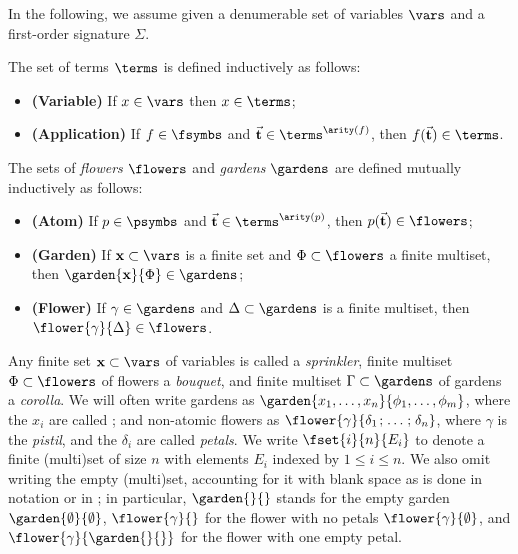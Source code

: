 \begin{scope}
In the following, we assume given a denumerable set of variables $\vars$
and a first-order signature $\Sigma$.

\begin{definition}[Terms]
  The set of terms $\terms$ is defined inductively as follows:
  \begin{itemize}
    \item{\textbf{(Variable)}} If $x \in \vars$ then $x \in \terms$;
    \item{\textbf{(Application)}} If $f \in \fsymbs$ and $\tvec{t}
    \in \terms^{\arity(f)}$, then $f(\tvec{t}) \in \terms$.
  \end{itemize}
\end{definition}

\begin{definition}[Flowers]
  The sets of \emph{flowers} $\flowers$ and \emph{gardens} $\gardens$ are
  defined mutually inductively as follows:
  \begin{itemize}
    \item{\textbf{(Atom)}} If $p \in \psymbs$ and $\tvec{t} \in
    \terms^{\arity(p)}$, then $p(\tvec{t}) \in \flowers$;
    \item{\textbf{(Garden)}} If $\bx \subset \vars$ is a finite set and $\Phi
    \subset \flowers$ a finite multiset, then $\garden{\bx}{\Phi} \in
    \gardens$;
    \item{\textbf{(Flower)}} If $\gamma \in \gardens$ and $\Delta \subset \gardens$
    is a finite multiset, then $\flower{\gamma}{\Delta} \in \flowers$.
  \end{itemize}
\end{definition}

Any finite set $\bx \subset \vars$ of variables is called a \emph{sprinkler},
finite multiset $\Phi \subset \flowers$ of flowers a \emph{bouquet}, and finite
multiset $\Gamma \subset \gardens$ of gardens a \emph{corolla}. We will often
write gardens as $\garden{x_1, \ldots, x_n}{\phi_1, \ldots, \phi_m}$, where the
$x_i$ are called ; and non-atomic flowers as
$\flower{\gamma}{\delta_1 \sep \ldots \sep \delta_n}$, where $\gamma$ is the
\emph{pistil}, and the $\delta_i$ are called \emph{petals}. We write
$\fset{i}{n}{E_i}$ to denote a finite (multi)set of size $n$ with elements $E_i$
indexed by $1 \leq i \leq n$. We also omit writing the empty (multi)set,
accounting for it with blank space as is done in  notation or in ; in
particular, $\garden{{}}{{}}$ stands for the empty garden
$\garden{\emptyset}{\emptyset}$, $\flower{\gamma}{{}}$ for the flower with no
petals $\flower{\gamma}{\emptyset}$, and $\flower{\gamma}{\garden{{}}{{}}}$ for
the flower with one empty petal.


\end{scope}
